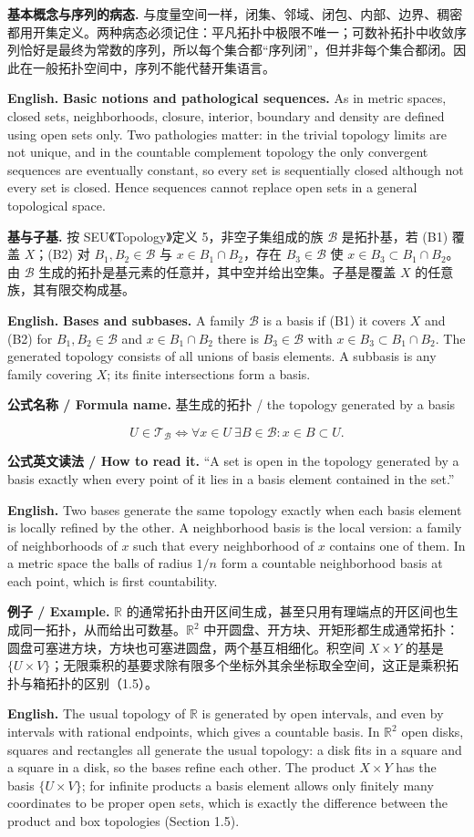 \documentclass[UTF8,11pt,a4paper]{ctexart}
\newcommand{\EN}[1]{\par\noindent\textbf{English.} #1\par}
\newcommand{\READ}[1]{\par\noindent\textbf{公式英文读法 / How to read it.} #1\par}
\newcommand{\FORMULA}[2]{\par\noindent\textbf{公式名称 / Formula name.} #1 / #2\par}
\newcommand{\EX}[2]{\par\noindent\textbf{例子 / Example.} #1\par\EN{#2}}
\begin{document}
\noindent\textbf{基本概念与序列的病态.} 与度量空间一样，闭集、邻域、闭包、内部、边界、稠密都用开集定义。两种病态必须记住：平凡拓扑中极限不唯一；可数补拓扑中收敛序列恰好是最终为常数的序列，所以每个集合都“序列闭”，但并非每个集合都闭。因此在一般拓扑空间中，序列不能代替开集语言。
\EN{\textbf{Basic notions and pathological sequences.} As in metric spaces, closed sets, neighborhoods, closure, interior, boundary and density are defined using open sets only. Two pathologies matter: in the trivial topology limits are not unique, and in the countable complement topology the only convergent sequences are eventually constant, so every set is sequentially closed although not every set is closed. Hence sequences cannot replace open sets in a general topological space.}

\noindent\textbf{基与子基.} 按 SEU《Topology》定义 5，非空子集组成的族 $\mathcal B$ 是拓扑基，若 (B1) 覆盖 $X$；(B2) 对 $B_1,B_2\in\mathcal B$ 与 $x\in B_1\cap B_2$，存在 $B_3\in\mathcal B$ 使 $x\in B_3\subset B_1\cap B_2$。由 $\mathcal B$ 生成的拓扑是基元素的任意并，其中空并给出空集。子基是覆盖 $X$ 的任意族，其有限交构成基。
\EN{\textbf{Bases and subbases.} A family $\mathcal B$ is a basis if (B1) it covers $X$ and (B2) for $B_1,B_2\in\mathcal B$ and $x\in B_1\cap B_2$ there is $B_3\in\mathcal B$ with $x\in B_3\subset B_1\cap B_2$. The generated topology consists of all unions of basis elements. A subbasis is any family covering $X$; its finite intersections form a basis.}

\FORMULA{基生成的拓扑}{the topology generated by a basis}
\[
U\in\mathcal T_{\mathcal B}\iff \forall x\in U\ \exists B\in\mathcal B:x\in B\subset U .
\]
\READ{``A set is open in the topology generated by a basis exactly when every point of it lies in a basis element contained in the set.''}
\EN{Two bases generate the same topology exactly when each basis element is locally refined by the other. A neighborhood basis is the local version: a family of neighborhoods of $x$ such that every neighborhood of $x$ contains one of them. In a metric space the balls of radius $1/n$ form a countable neighborhood basis at each point, which is first countability.}

\EX{$\mathbb R$ 的通常拓扑由开区间生成，甚至只用有理端点的开区间也生成同一拓扑，从而给出可数基。$\mathbb R^2$ 中开圆盘、开方块、开矩形都生成通常拓扑：圆盘可塞进方块，方块也可塞进圆盘，两个基互相细化。积空间 $X\times Y$ 的基是 $\{U\times V\}$；无限乘积的基要求除有限多个坐标外其余坐标取全空间，这正是乘积拓扑与箱拓扑的区别（1.5）。}{The usual topology of $\mathbb R$ is generated by open intervals, and even by intervals with rational endpoints, which gives a countable basis. In $\mathbb R^2$ open disks, squares and rectangles all generate the usual topology: a disk fits in a square and a square in a disk, so the bases refine each other. The product $X\times Y$ has the basis $\{U\times V\}$; for infinite products a basis element allows only finitely many coordinates to be proper open sets, which is exactly the difference between the product and box topologies (Section 1.5).}
\end{document}

